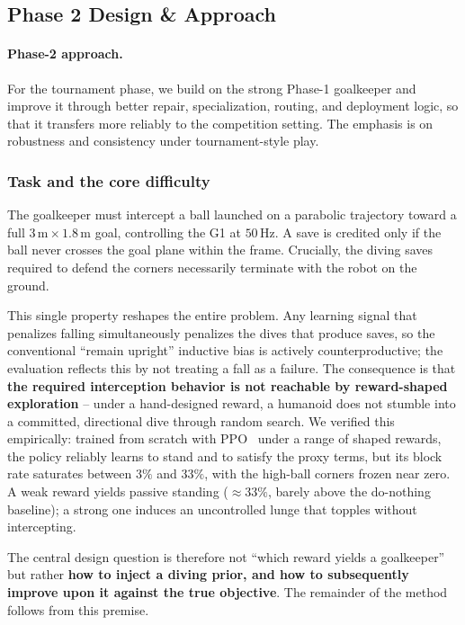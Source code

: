 \documentclass{article}
\begin{document}
\subsection{Phase 2 Design \& Approach}

\paragraph{Phase-2 approach.} For the tournament phase, we build on the strong
Phase-1 goalkeeper and improve it through better repair, specialization,
routing, and deployment logic, so that it transfers more reliably to the
competition setting. The emphasis is on robustness and consistency under
tournament-style play.

\subsubsection{Task and the core difficulty}\label{sec:gk-task}

The goalkeeper must intercept a ball launched on a parabolic trajectory toward a
full $3\,\text{m}\times1.8\,\text{m}$ goal, controlling the G1 at $50$\,Hz. A
save is credited only if the ball never crosses the goal plane within the frame.
Crucially, the diving saves required to defend the corners necessarily terminate
with the robot on the ground.

This single property reshapes the entire problem. Any learning signal that
penalizes falling simultaneously penalizes the dives that produce saves, so the
conventional ``remain upright'' inductive bias is actively counterproductive; the
evaluation reflects this by not treating a fall as a failure. The consequence is
that \textbf{the required interception behavior is not reachable by reward-shaped
exploration} -- under a hand-designed reward, a humanoid does not stumble into a
committed, directional dive through random search. We verified this empirically:
trained from scratch with PPO~\cite{ppo} under a range of shaped rewards, the
policy reliably learns to stand and to satisfy the proxy terms, but its block
rate saturates between $3\%$ and $33\%$, with the high-ball corners frozen near
zero. A weak reward yields passive standing ($\approx 33\%$, barely above the
do-nothing baseline); a strong one induces an uncontrolled lunge that topples
without intercepting.

The central design question is therefore not ``which reward yields a goalkeeper''
but rather \textbf{how to inject a diving prior, and how to subsequently improve
upon it against the true objective}. The remainder of the method follows from
this premise.
\end{document}

